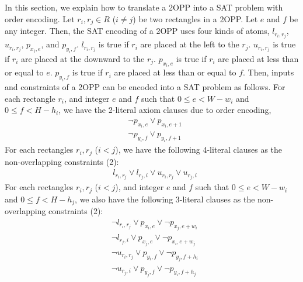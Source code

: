 \documentclass[a4paper,11pt]{book}
\begin{document}

In this section, we explain how to translate a 2OPP into a SAT problem with order encoding. Let $r_i,r_j \in R$ ($i \neq j$) be two rectangles in a 2OPP. Let $e$ and $f$ be any integer. Then, the SAT encoding of a 2OPP uses four kinds of atoms, $l_{r_i,r_j}$, $u_{r_i,r_j}$, $p_{x_i,e}$, and $p_{y_i,f}$. $l_{r_i,r_j}$ is true if $r_i$ are placed at the left to the $r_j$. $u_{r_i,r_j}$ is true if $r_i$ are placed at the downward to the $r_j$. $p_{x_i,e}$ is true if $r_i$ are placed at less than or equal to $e$. $p_{y_i,f}$ is true if $r_i$ are placed at less than or equal to $f$. Then, inputs and constraints of a 2OPP can be encoded into a SAT problem as follows.
For each rectangle $r_i$, and integer $e$ and $f$ such that $0 \leq e < W - w_i$ and $0 \leq f < H - h_i$, we have the 2-literal axiom clauses due to order encoding,
\begin{equation}
	\begin{aligned}
		&\neg p_{x_i,e} \lor p_{x_i,e+1} \\
		&\neg p_{y_i,f} \lor p_{y_i,f+1}
	\end{aligned}
\end{equation}
For each rectangles $r_i,r_j$ ($i < j$), we have the following 4-literal clauses as the non-overlapping constraints (2):
\begin{equation}
	\begin{aligned}
		&l_{r_i,r_j} \lor l_{r_j,i} \lor u_{r_i,r_j} \lor u_{r_j,i}
	\end{aligned}
\end{equation}
For each rectangles $r_i,r_j$ ($i < j$), and integer $e$ and $f$ such that $0 \leq e < W - w_i$ and $0 \leq f < H - h_j$, we also have the following 3-literal clauses as the non-overlapping constraints (2):
\begin{equation}
	\begin{aligned}
		&\neg l_{r_i,r_j} \lor p_{x_i,e} \lor \neg p_{x_j,e+w_i} \\
		&\neg l_{r_j,i} \lor p_{x_j,e} \lor \neg p_{x_i,e+w_j} \\
		&\neg u_{r_i,r_j} \lor p_{y_i,f} \lor \neg p_{y_j,f+h_i} \\
		&\neg u_{r_j,i} \lor p_{y_j,f} \lor \neg p_{y_i,f+h_j}
	\end{aligned}
\end{equation}
\end{document}
